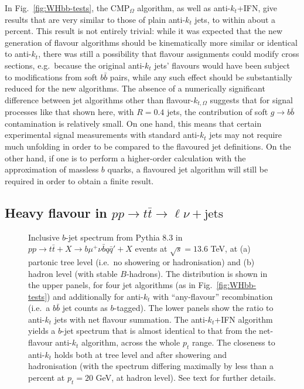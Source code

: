 \documentclass[nofootinbib,twocolumn,preprintnumbers,superscriptaddress,aps]{revtex4-2}
\begin{document}
In Fig.~\ref{fig:WHbb-tests},
the CMP$_\Omega$ algorithm, as well as anti-$k_t$+IFN, give results that are very similar to
those of plain anti-$k_t$ jets, to within about a percent.
%
This result is not entirely trivial: while it was expected that the
new generation of flavour algorithms should be kinematically more
similar or identical to anti-$k_t$, there was still a possibility that
flavour assignments could modify cross sections, e.g.\ because the
original anti-$k_t$ jets' flavours would have been subject to
modifications from soft $b\bar b$ pairs, while any such effect should
be substantially reduced for the new algorithms.
%
The absence of a numerically significant difference between jet
algorithms other than flavour-$k_{t,\Omega}$ suggests that for signal processes
like that shown here, with $R=0.4$ jets, the contribution of soft
$g\to b\bar b$ contamination is relatively small.
%
On one hand, this means that certain experimental signal measurements with
standard anti-$k_t$ jets may not require much unfolding in order to be
compared to the flavoured jet definitions.
%
On the other hand, if one is to perform a higher-order calculation
with the approximation of massless $b$ quarks, a flavoured jet
algorithm will still be required in order to obtain a finite
result. 


\subsection{Heavy flavour in $pp \to t\bar t \to \ell\nu+\text{jets}$}
\label{sec:pheno-ttbar}


\begin{figure*}
  \centering
  \hfill
  \caption{
  Inclusive $b$-jet spectrum from Pythia 8.3 in
    $pp \to t\bar t + X \to b\mu^+\nu \bar b q\bar q'  +
    X$ events at $\sqrt{s}=13.6$ TeV, at
    (a) partonic tree level (i.e.\ no showering or hadronisation)
    and (b) hadron level (with stable $B$-hadrons).
    The distribution is shown in the upper panels, for four jet
    algorithms (as in Fig.~\ref{fig:WHbb-tests}) and additionally for
    anti-$k_t$ with ``any-flavour'' recombination (i.e.\ a $b\bar b$
    jet counts as $b$-tagged).
    The lower panels show the ratio to anti-$k_t$ jets with net
    flavour summation.
    The anti-$k_t$+IFN algorithm  yields
    a $b$-jet spectrum that is almost identical to that from
    the net-flavour anti-$k_t$ algorithm,  across the whole
    $p_t$ range. 
    The closeness to anti-$k_t$ holds both at tree level and after
    showering and hadronisation (with the spectrum differing maximally
    by less than a percent at $p_t=20$ GeV, at hadron level).
    See text for further details.  }
  \label{fig:ttbar-tests}
\end{figure*}
\end{document}
